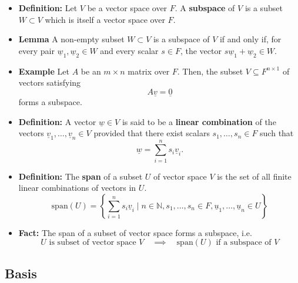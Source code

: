 \documentclass[11pt,twoside]{report}
\newcommand{\bbN}{{\mathbb{N}}}
\newcommand{\vecnot}{\underline}
\newcommand{\Span}{\mathrm{span}}
\begin{document}
\begin{itemize}

\item \textbf{Definition:}  Let $V$ be a vector space over $F$.
A \textbf{subspace} of $V$ is a subset $W \subset V$ which is itself a vector space over $F$.


\item \textbf{Lemma} 
A non-empty subset $W \subset V$ is a subspace of $V$ if and only if, for every pair $\vecnot{w}_1, \vecnot{w}_2 \in W$ and every scalar $s \in F$, the vector $s \vecnot{w}_1 + \vecnot{w}_2 \in W$.




\item \textbf{Example} 
Let $A$ be an $m \times n$ matrix over $F$.
Then, the subset $V\subseteq F^{n \times 1}$ of vectors satisfying 
\[
A \vecnot{v} = \vecnot{0}
\]
forms a subspace.





\item  \textbf{Definition:}  A vector $\vecnot{w} \in V$ is said to be a \textbf{linear combination} of the vectors $\vecnot{v}_1, \ldots, \vecnot{v}_n \in V$ provided that there exist scalars $s_1, \ldots, s_n \in F$ such that
\begin{equation*}
\vecnot{w} = \sum_{i=1}^n s_i \vecnot{v}_i.
\end{equation*}



\item  \textbf{Definition:} %
The \textbf{span} of a subset  $U$  of vector space $V$ is the set of all finite linear combinations of vectors in $U$.
\[
\Span(U) = \left\{ \sum_{i=1}^n s_i \vecnot{v}_i  \mid n \in \bbN,  s_1, \dots, s_n \in F, \vecnot{u}_1, \dots, \vecnot{u}_n \in U  \right \}
\]


\item \textbf{Fact:}  The span of a subset of vector space forms a subspace, i.e.
\[
\text{$U$ is subset of vector space $V$} \quad \implies \quad  \text{$\Span(U)$ if a subspace of $V$}
\]
\end{itemize}

\subsection{Basis}
\end{document}
